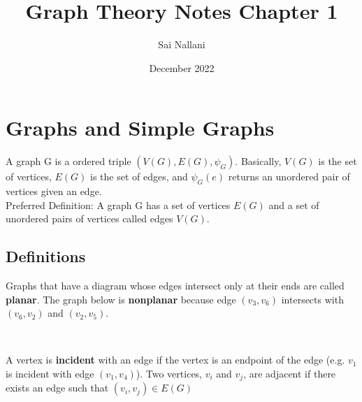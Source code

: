 \documentclass{article}
\title{Graph Theory Notes Chapter 1}
\author{Sai Nallani}
\date{December 2022}
\begin{document}
\maketitle

\section{Graphs and Simple Graphs}
A graph G is a ordered triple $(V(G), E(G), \psi_G)$. Basically,
$V(G)$ is the set of vertices, $E(G)$ is the
set of edges, and $\psi_G(e)$ returns an unordered pair of
vertices given an edge.\\
Preferred Definition: A graph G has a set of vertices $E(G)$
and a set of unordered pairs of vertices called edges $V(G)$.\\
\subsection{Definitions}
Graphs that have a diagram whose edges intersect only at their ends are
called \textbf{planar}.
The graph below is \textbf{nonplanar} because edge $(v_3, v_6)$ intersects
with $(v_6, v_2)$ and $(v_2, v_5)$.\\
\begin{center}
    \\
\end{center}
A vertex is \textbf{incident} with an edge if the vertex is an endpoint
of the edge (e.g. $v_1$ is incident with edge $(v_1, v_4)$). Two vertices,
$v_i$ and $v_j$, are adjacent if there exists an edge such that $(v_i, v_j)
\in E(G)$
\end{document}
